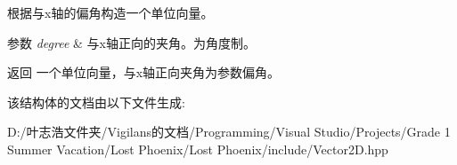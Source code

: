 根据与x轴的偏角构造一个单位向量。 


\begin{DoxyParams}{参数}
{\em degree} & 与x轴正向的夹角。为角度制。 \\
\hline
\end{DoxyParams}
\begin{DoxyReturn}{返回}
一个单位向量，与x轴正向夹角为参数偏角。 
\end{DoxyReturn}


该结构体的文档由以下文件生成\+:\begin{DoxyCompactItemize}
\item 
D\+:/叶志浩文件夹/\+Vigilans的文档/\+Programming/\+Visual Studio/\+Projects/\+Grade 1 Summer Vacation/\+Lost Phoenix/\+Lost Phoenix/include/Vector2\+D.\+hpp\end{DoxyCompactItemize}
